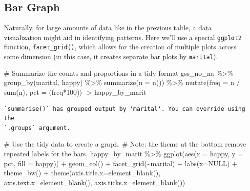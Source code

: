 \documentclass[
  letterpaper,
]{book}
\newenvironment{Shaded}{\begin{snugshade}}{\end{snugshade}}
\newcommand{\AttributeTok}[1]{\textcolor[rgb]{0.40,0.45,0.13}{#1}}
\newcommand{\CommentTok}[1]{\textcolor[rgb]{0.37,0.37,0.37}{#1}}
\newcommand{\ConstantTok}[1]{\textcolor[rgb]{0.56,0.35,0.01}{#1}}
\newcommand{\DecValTok}[1]{\textcolor[rgb]{0.68,0.00,0.00}{#1}}
\newcommand{\FunctionTok}[1]{\textcolor[rgb]{0.28,0.35,0.67}{#1}}
\newcommand{\NormalTok}[1]{\textcolor[rgb]{0.00,0.23,0.31}{#1}}
\newcommand{\OtherTok}[1]{\textcolor[rgb]{0.00,0.23,0.31}{#1}}
\newcommand{\SpecialCharTok}[1]{\textcolor[rgb]{0.37,0.37,0.37}{#1}}
\begin{document}
\hypertarget{bar-graph}{%
\subsection{Bar Graph}\label{bar-graph}}

Naturally, for large amounts of data like in the previous table, a data
visualization might aid in identifying patterns. Here we'll use a
special \texttt{ggplot2} function, \texttt{facet\_grid()}, which allows
for the creation of multiple plots across some dimension (in this case,
it creates separate bar plots by \texttt{marital}).

\begin{Shaded}
\begin{Highlighting}[]
\CommentTok{\# Summarize the counts and proportions in a tidy format}
\NormalTok{gss\_no\_na }\SpecialCharTok{\%\textgreater{}\%}
  \FunctionTok{group\_by}\NormalTok{(marital, happy) }\SpecialCharTok{\%\textgreater{}\%}
  \FunctionTok{summarize}\NormalTok{(}\AttributeTok{n =} \FunctionTok{n}\NormalTok{()) }\SpecialCharTok{\%\textgreater{}\%}
  \FunctionTok{mutate}\NormalTok{(}\AttributeTok{freq =}\NormalTok{ n }\SpecialCharTok{/} \FunctionTok{sum}\NormalTok{(n),}
         \AttributeTok{pct =}\NormalTok{ (freq}\SpecialCharTok{*}\DecValTok{100}\NormalTok{)) }\OtherTok{{-}\textgreater{}}\NormalTok{ happy\_by\_marit}
\end{Highlighting}
\end{Shaded}

\begin{verbatim}
`summarise()` has grouped output by 'marital'. You can override using the
`.groups` argument.
\end{verbatim}

\begin{Shaded}
\begin{Highlighting}[]
\CommentTok{\# Use the tidy data to create a graph.}
\CommentTok{\# Note: the theme at the bottom remove repeated labels for the bars.}
\NormalTok{happy\_by\_marit }\SpecialCharTok{\%\textgreater{}\%}
  \FunctionTok{ggplot}\NormalTok{(}\FunctionTok{aes}\NormalTok{(}\AttributeTok{x =}\NormalTok{ happy,}
             \AttributeTok{y =}\NormalTok{ pct,}
             \AttributeTok{fill =}\NormalTok{ happy)) }\SpecialCharTok{+}
  \FunctionTok{geom\_col}\NormalTok{() }\SpecialCharTok{+}
  \FunctionTok{facet\_grid}\NormalTok{(}\SpecialCharTok{\textasciitilde{}}\NormalTok{marital) }\SpecialCharTok{+} \FunctionTok{labs}\NormalTok{(}\AttributeTok{x=}\ConstantTok{NULL}\NormalTok{) }\SpecialCharTok{+} \FunctionTok{theme\_bw}\NormalTok{() }\SpecialCharTok{+} 
  \FunctionTok{theme}\NormalTok{(}\AttributeTok{axis.title.x=}\FunctionTok{element\_blank}\NormalTok{(),}
        \AttributeTok{axis.text.x=}\FunctionTok{element\_blank}\NormalTok{(),}
        \AttributeTok{axis.ticks.x=}\FunctionTok{element\_blank}\NormalTok{())}
\end{Highlighting}
\end{Shaded}
\end{document}
